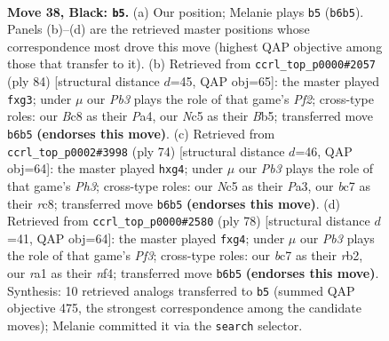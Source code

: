 \documentclass[11pt]{article}
\begin{document}
\clearpage

\begin{figure}[p]\centering
\begin{subfigure}{0.46\textwidth}\centering
\resizebox{\linewidth}{!}{%
\newchessgame
\chessboard[
  setfen={r1bN4/2B4k/1pP1p3/P1np4/8/2P5/5K2/R7 b - - 1 38},
  showmover=false,
  pgfstyle=straightmove, color=movearrow, markmove={b6-b5}
]}
\caption{}
\end{subfigure}\hfill
\begin{subfigure}{0.46\textwidth}\centering
\resizebox{\linewidth}{!}{%
\newchessgame
\chessboard[
  setfen={3r4/6k1/1p5p/pB6/P2b4/6p1/3R1PK1/8 w - - 0 43},
  showmover=false,
  pgfstyle=straightmove, color=movearrow, markmove={f2-g3}
]}
\caption{}
\end{subfigure}
\\[4pt]
\begin{subfigure}{0.46\textwidth}\centering
\resizebox{\linewidth}{!}{%
\newchessgame
\chessboard[
  setfen={2r5/3R2pk/2nB1p2/1p6/5Pp1/P6P/5K2/8 w - - 0 38},
  showmover=false,
  pgfstyle=straightmove, color=movearrow, markmove={h3-g4}
]}
\caption{}
\end{subfigure}\hfill
\begin{subfigure}{0.46\textwidth}\centering
\resizebox{\linewidth}{!}{%
\newchessgame
\chessboard[
  setfen={6k1/p7/2p1p1p1/2B1b3/4NnpP/R4P2/Pr6/3K4 w - - 0 40},
  showmover=false,
  pgfstyle=straightmove, color=movearrow, markmove={f3-g4}
]}
\caption{}
\end{subfigure}
\caption{\textbf{Move 38, Black: \texttt{b5}.} (a) Our position; Melanie plays \texttt{b5} (\texttt{b6b5}). Panels (b)--(d) are the retrieved master positions whose correspondence most drove this move (highest QAP objective among those that transfer to it). (b) Retrieved from \texttt{ccrl\_top\_p0000\#2057} (ply 84) [structural distance $d$=45, QAP obj=65]: the master played \texttt{fxg3}; under $\mu$ our \emph{Pb3} plays the role of that game's \emph{Pf2}; cross-type roles: our \emph{B}c8 as their \emph{P}a4, our \emph{N}c5 as their \emph{B}b5; transferred move \texttt{b6b5} \textbf{(endorses this move)}. (c) Retrieved from \texttt{ccrl\_top\_p0002\#3998} (ply 74) [structural distance $d$=46, QAP obj=64]: the master played \texttt{hxg4}; under $\mu$ our \emph{Pb3} plays the role of that game's \emph{Ph3}; cross-type roles: our \emph{N}c5 as their \emph{P}a3, our \emph{b}c7 as their \emph{r}c8; transferred move \texttt{b6b5} \textbf{(endorses this move)}. (d) Retrieved from \texttt{ccrl\_top\_p0000\#2580} (ply 78) [structural distance $d$=41, QAP obj=64]: the master played \texttt{fxg4}; under $\mu$ our \emph{Pb3} plays the role of that game's \emph{Pf3}; cross-type roles: our \emph{b}c7 as their \emph{r}b2, our \emph{r}a1 as their \emph{n}f4; transferred move \texttt{b6b5} \textbf{(endorses this move)}. Synthesis: 10 retrieved analogs transferred to \texttt{b5} (summed QAP objective 475, the strongest correspondence among the candidate moves); Melanie committed it via the \texttt{search} selector.}
\label{fig:thought-m75}
\end{figure}
\end{document}
